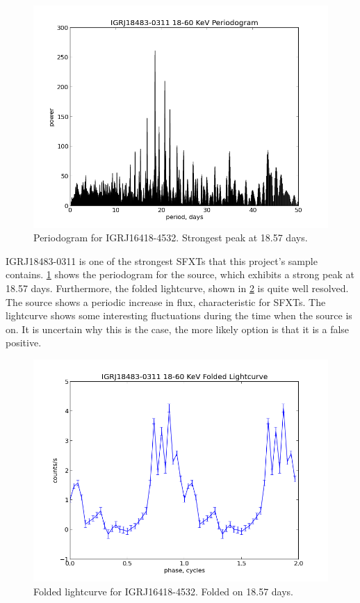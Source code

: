 \begin{figure}[h!]
\centering
\includegraphics[width=130mm]{gfx/Fig16.png}
\caption{Periodogram for IGRJ16418-4532. Strongest peak at 18.57 days.}
\label{Figure 16}
\end{figure} 


IGRJ18483-0311 is one of the strongest SFXTs that this project\textquoteright{}s sample contains. \ref{Figure 16} shows the periodogram for the source, which exhibits a strong peak at 18.57 days. Furthermore, the folded lightcurve, shown in \ref{Figure 17} is quite well resolved. The source shows a periodic increase in flux, characteristic for SFXTs. The lightcurve shows some interesting fluctuations during the time when the source is on. It is uncertain why this is the case, the more likely option is that it is a false positive. 

\begin{figure}[h!]
\centering
\includegraphics[width=130mm]{gfx/Fig17.png}
\caption{Folded lightcurve for IGRJ16418-4532. Folded on 18.57 days.}
\label{Figure 17}
\end{figure} 

